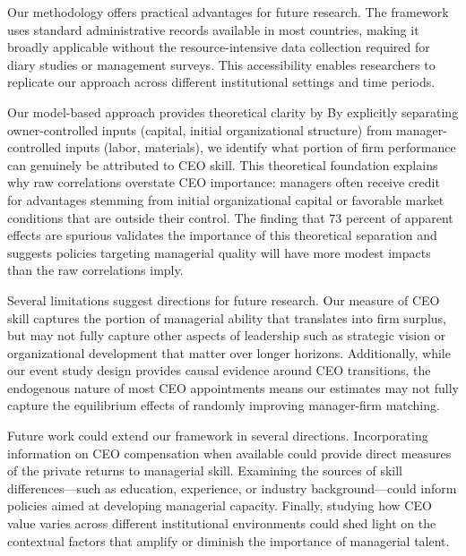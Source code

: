 \documentclass[11pt,a4paper]{article}
\begin{document}
Our methodology offers practical advantages for future research. The framework uses standard administrative records available in most countries, making it broadly applicable without the resource-intensive data collection required for diary studies or management surveys. This accessibility enables researchers to replicate our approach across different institutional settings and time periods.

Our model-based approach provides theoretical clarity by By explicitly separating owner-controlled inputs (capital, initial organizational structure) from manager-controlled inputs (labor, materials), we identify what portion of firm performance can genuinely be attributed to CEO skill. This theoretical foundation explains why raw correlations overstate CEO importance: managers often receive credit for advantages stemming from initial organizational capital or favorable market conditions that are outside their control. The finding that 73 percent of apparent effects are spurious validates the importance of this theoretical separation and suggests policies targeting managerial quality will have more modest impacts than the raw correlations imply.

Several limitations suggest directions for future research. Our measure of CEO skill captures the portion of managerial ability that translates into firm surplus, but may not fully capture other aspects of leadership such as strategic vision or organizational development that matter over longer horizons. Additionally, while our event study design provides causal evidence around CEO transitions, the endogenous nature of most CEO appointments means our estimates may not fully capture the equilibrium effects of randomly improving manager-firm matching.

Future work could extend our framework in several directions. Incorporating information on CEO compensation when available could provide direct measures of the private returns to managerial skill. Examining the sources of skill differences---such as education, experience, or industry background---could inform policies aimed at developing managerial capacity. Finally, studying how CEO value varies across different institutional environments could shed light on the contextual factors that amplify or diminish the importance of managerial talent.
\end{document}

